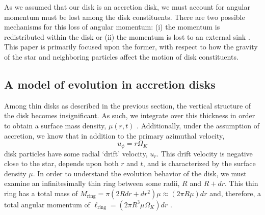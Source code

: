 \documentclass[aps,pra,twocolumn]{revtex4-1}
\begin{document}
As we assumed that our disk is an accretion disk, we must account for angular momentum must be lost among the disk constituents.  There are two possible mechanisms for this loss of angular momentum: (i) the momentum is redistributed within the disk or (ii) the momentum is lost to an external sink \cite{armitage2011}.  This paper is primarily focused upon the former, with respect to how the gravity of the star and neighboring particles affect the motion of disk constituents.


\subsection{\label{section2.1} A model of evolution in accretion disks }
Among thin disks as described in the previous section, the vertical structure of the disk becomes insignificant.  As such, we integrate over this thickness in order to obtain a surface mass density, $\mu(r, t)$  \cite{armitage2011}.  Additionally, under the assumption of accretion, we know that in addition to the primary azimuthal velocity,
\begin{equation}
u_\phi = r\Omega_K
\end{equation}
disk particles have some radial `drift' velocity, $u_r$.  This drift velocity is negative close to the star, depends upon both $r$ and $t$, and is characterized by the surface density $\mu$.  In order to understand the evolution behavior of the disk, we must examine an infinitesimally thin ring between some radii, $R$ and $R + dr$.  This thin ring has a total mass of $M_\text{ring} = \pi \left(2 R dr + dr^2 \right)\mu \approx (2 \pi R \mu) dr$ and, therefore, a total angular momentum of $\ell_\text{ring} = (2\pi R^3 \mu \Omega_K)dr$ \cite{king2002}.
\end{document}

